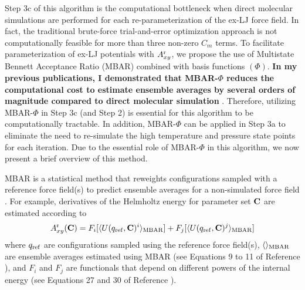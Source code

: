 \documentclass[12pt,a4paper]{article}
\newcommand{\bfm}[1]{{\bf #1}}
\newcommand{\C}{\bfm{C}}
\begin{document}
Step 3c of this algorithm is the computational bottleneck when direct molecular simulations are performed for each re-parameterization of the ex-LJ force field. In fact, the traditional brute-force trial-and-error optimization approach is not computationally feasible for more than three non-zero $C_m$ terms. To facilitate parameterization of ex-LJ potentials with $A_{xy}^{\rm r}$, we propose the use of Multistate Bennett Acceptance Ratio (MBAR) combined with basis functions $(\Phi)$. \textbf{In my previous publications, I demonstrated that MBAR-$\Phi$ reduces the computational cost to estimate ensemble averages by several orders of magnitude compared to direct molecular simulation} \cite{Messerly2018_1,Messerly2018_2}. Therefore, utilizing MBAR-$\Phi$ in Step 3c (and Step 2) is essential for this algorithm to be computationally tractable. In addition, MBAR-$\Phi$ can be applied in Step 3a to eliminate the need to re-simulate the high temperature and pressure state points for each iteration. Due to the essential role of MBAR-$\Phi$ in this algorithm, we now present a brief overview of this method. 


MBAR is a statistical method that reweights configurations sampled with a reference force field(s) to predict ensemble averages for a non-simulated force field \cite{shirts-chodera:jcp:2008:mbar,Messerly2018_1}. For example, derivatives of the Helmholtz energy for parameter set $\C$ are estimated according to 
\begin{equation}
A_{xy}^{\rm r}(\C) = F_i[\langle U(q_{\rm ref},\C)^i \rangle_{\rm MBAR}] + F_j[\langle U(q_{\rm ref},\C)^j \rangle_{\rm MBAR}]
\end{equation}
where $q_{\rm ref}$ are configurations sampled using the reference force field(s), $\langle\rangle_{\rm MBAR}$ are ensemble averages estimated using MBAR (see Equations 9 to 11 of Reference ), and $F_i$ and $F_j$ are functionals that depend on different powers of the internal energy (see Equations 27 and 30 of Reference ). 
\end{document}
